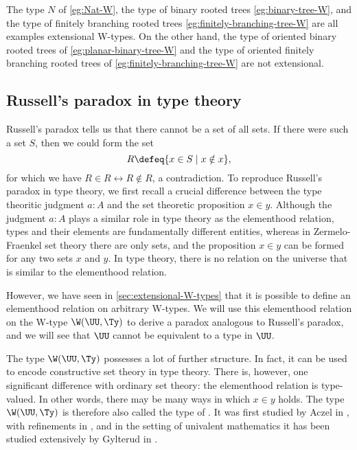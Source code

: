 \begin{eg}
  The type $N$ of \cref{eg:Nat-W}, the type of binary rooted trees \cref{eg:binary-tree-W}, and the type of finitely branching rooted trees \cref{eg:finitely-branching-tree-W} are all examples extensional W-types. On the other hand, the type of oriented binary rooted trees of \cref{eg:planar-binary-tree-W} and the type of oriented finitely branching rooted trees of \cref{eg:finitely-branching-tree-W} are not extensional.
\end{eg}


\subsection{Russell's paradox in type theory}\label{subsec:russell}

Russell's paradox tells us that there cannot be a set of all sets. If there were such a set $S$, then we could form the set
\begin{equation*}
  R\defeq \{x\in S\mid x\notin x\},
\end{equation*}
for which we have $R\in R\leftrightarrow R\notin R$, a contradiction. To reproduce Russell's paradox in type theory, we first recall a crucial difference between the type theoritic judgment $a:A$ and the set theoretic proposition $x\in y$. Although the judgment $a:A$ plays a similar role in type theory as the elementhood relation, types and their elements are fundamentally different entities, whereas in Zermelo-Fraenkel set theory there are only sets, and the proposition $x\in y$ can be formed for any two sets $x$ and $y$. In type theory, there is no relation on the universe that is similar to the elementhood relation.

However, we have seen in \cref{sec:extensional-W-types} that it is possible to define an elementhood relation on arbitrary W-types. We will use this elementhood relation on the W-type $\W(\UU,\Ty)$ to derive a paradox analogous to Russell's paradox, and we will see that $\UU$ cannot be equivalent to a type in $\UU$.

The type $\W(\UU,\Ty)$ possesses a lot of further structure. In fact, it can be used to encode constructive set theory in type theory. There is, however, one significant difference with ordinary set theory: the elementhood relation is type-valued. In other words, there may be many ways in which $x\in y$ holds. The type $\W(\UU,\Ty)$ is therefore also called the type of . It was first studied by Aczel in \cite{AczelCZF}, with refinements in \cite{AczelGambinoCZF}, and in the setting of univalent mathematics it has been studied extensively by Gylterud in \cite{GylterudMultisets}.

